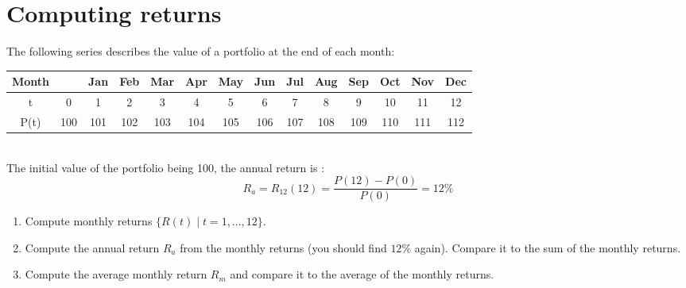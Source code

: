 \section{Computing returns}

The following series describes the value of a portfolio at the end of each month:\\

\begin{tabular}{|c|ccccccccccccc|}
\hline
Month &    & Jan & Feb & Mar & Apr & May & Jun & Jul & Aug & Sep & Oct & Nov & Dec \\ 
\hline
t     & 0 & 1 & 2 & 3 & 4 & 5 & 6 & 7 & 8 & 9 & 10 & 11 & 12 \\
\hline
P(t)  & 100 & 101 & 102 & 103 & 104 & 105 & 106 & 107 & 108 & 109 & 110 & 111 & 112 \\
\hline
\end{tabular}
\\

\noindent The initial value of the portfolio being 100, the annual return is : $$R_a = R_{12}(12) = \frac{P(12) - P(0)}{P(0)} = 12\%$$

\begin{enumerate}
    \item Compute monthly returns $\{R(t) \mid t = 1,...,12\}$.
    \item Compute the annual return $R_a$ from the monthly returns (you should find $12\%$ again). Compare it to the sum of the monthly returns.  
    \item Compute the average monthly return $R_m$ and compare it to the average of the monthly returns.
\end{enumerate}

